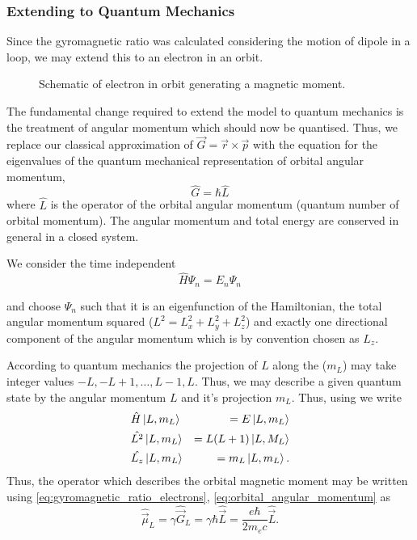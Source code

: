 \subsubsection{Extending to Quantum Mechanics}
Since the gyromagnetic ratio was calculated considering the motion of dipole in a loop, we may extend this to an electron in an orbit.

\begin{wrapfigure}{r}{0.5\textwidth}%
	\begin{center}
		
		\caption{Schematic of electron in orbit generating a magnetic moment.}%
	\end{center}
\end{wrapfigure}%
The fundamental change required to extend the model to quantum mechanics is the treatment of angular momentum which should now be quantised.
Thus, we replace our classical approximation of $\vec{G} = \vec{r} \times \vec{p}$ with the equation for the eigenvalues of the quantum mechanical representation of orbital angular momentum,
\begin{equation}
	\hat{G} = \hbar \hat{L}
	\label{eq:orbital_angular_momentum}
\end{equation}
where $\hat{L}$ is the operator of the orbital angular momentum (quantum number of orbital momentum).
The angular momentum and total energy are conserved in general in a closed system.

We consider the time independent 
\begin{equation}
	\hat{H} \Psi_n = E_n \Psi_n
	\label{eq:TISE}
\end{equation}

and choose $\Psi_n$ such that it is an eigenfunction of the Hamiltonian, the total angular momentum squared ($L^2 = L_x^2 + L_y^2 + L_z^2$) and exactly one directional component of the angular momentum which is by convention chosen as $L_z$.

According to quantum mechanics the projection of $L$ along the  ($m_L$) may take integer values $-L, -L + 1, \dots, L-1, L$.
Thus, we may describe a given quantum state by the angular momentum $L$ and it's projection $m_L$. Thus, using  we write
\begin{eqnarray}
	&\hat{H}\ket{L, m_L} &= E\ket{L, m_L} \\
	&\hat{L^2}\ket{L, m_L} &= L(L+1)\ket{L, M_L} \\
	&\hat{L_z}\ket{L, m_L} &= m_L\ket{L, m_L}. \label{eq:zthcomponent}
\end{eqnarray}
Thus, the operator which describes the orbital magnetic moment may be written using  \eqref{eq:gyromagnetic_ratio_electrons}, \eqref{eq:orbital_angular_momentum} as
\begin{equation}
	\hat{\vec{\mu}}_L = \gamma \hat{\vec{G}}_L = \gamma \hbar \hat{\vec{L}} = \frac{e\hbar}{2m_e c}\hat{\vec{L}}.
	\label{eq:orbital_magnetic_moment_operator}
\end{equation}

